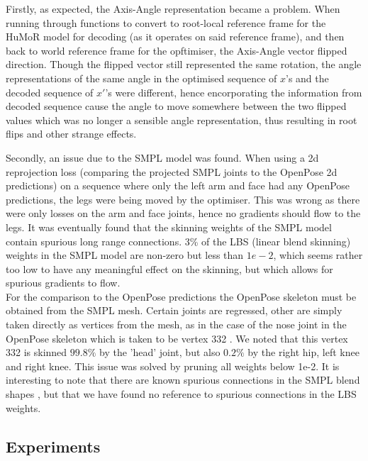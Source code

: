 Firstly, as expected, the Axis-Angle representation became a problem. When running through functions to convert to root-local reference frame for the HuMoR model for decoding (as it operates on said reference frame), and then back to world reference frame for the opftimiser, the Axis-Angle vector flipped direction. Though the flipped vector still represented the same rotation, the angle representations of the same angle in the optimised sequence of $x$'s and the decoded sequence of $x'$'s were different, hence encorporating the information from decoded sequence cause the angle to move somewhere between the two flipped values which was no longer a sensible angle representation, thus resulting in root flips and other strange effects.

Secondly, an issue due to the SMPL model was found. When using a 2d reprojection loss (comparing the projected SMPL joints to the OpenPose 2d predictions) on a sequence where only the left arm and face had any OpenPose predictions, the legs were being moved by the optimiser. This was wrong as there were only losses on the arm and face joints, hence no gradients should flow to the legs. It was eventually found that the skinning weights of the SMPL model \cite{SMPL} contain spurious long range connections. 3\% of the LBS (linear blend skinning) weights in the SMPL model are non-zero but less than $1e-2$, which seems rather too low to have any meaningful effect on the skinning, but which allows for spurious gradients to flow. \\
For the comparison to the OpenPose predictions the OpenPose skeleton must be obtained from the SMPL mesh. Certain joints are regressed, other are simply taken directly as vertices from the mesh, as in the case of the nose joint in the OpenPose skeleton which is taken to be vertex 332 \cite{SMPL_op_joints}. We noted that this vertex 332 is skinned $99.8\%$ by the 'head' joint, but also $0.2\%$ by the right hip, left knee and right knee. This issue was solved by pruning all weights below 1e-2. It is interesting to note that there are known spurious connections in the SMPL blend shapes \cite{STAR}, but that we have found no reference to spurious connections in the LBS weights.

\subsection{Experiments}


